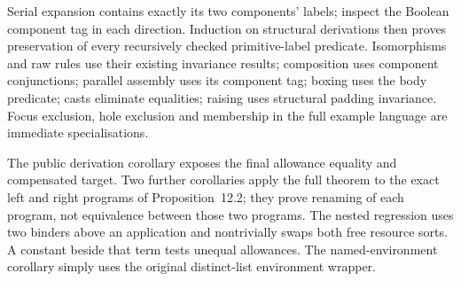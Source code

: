 Serial expansion contains exactly its two components' labels; inspect the
Boolean component tag in each direction. Induction on structural derivations
then proves preservation of every recursively checked primitive-label predicate.
Isomorphisms and raw rules use their existing invariance results; composition
uses component conjunctions; parallel assembly uses its component tag; boxing
uses the body predicate; casts eliminate equalities; raising uses structural
padding invariance. Focus exclusion, hole exclusion and membership in the full
example language are immediate specialisations.






The public derivation corollary exposes the final allowance equality and
compensated target. Two further corollaries apply the full theorem to the exact
left and right programs of Proposition~12.2; they prove renaming of each program,
not equivalence between those two programs. The nested regression uses two binders
above an application and nontrivially swaps both free resource sorts. A constant
beside that term tests unequal allowances. The named-environment corollary simply
uses the original distinct-list environment wrapper.







